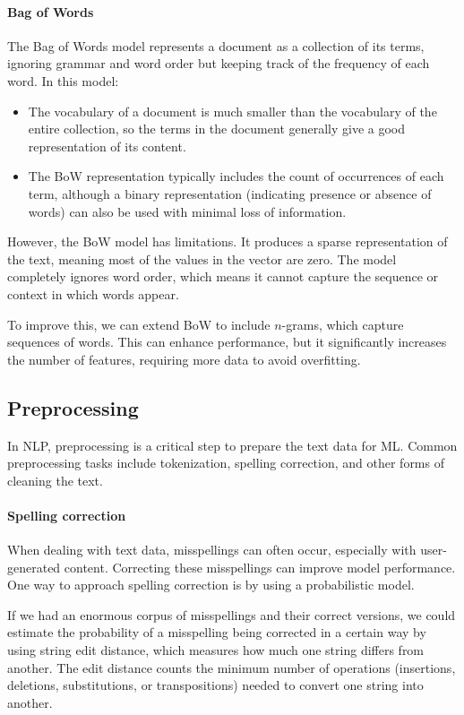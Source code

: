 \paragraph*{Bag of Words}
The Bag of Words model represents a document as a collection of its terms, ignoring grammar and word order but keeping track of the frequency of each word. 
In this model:
\begin{itemize}
    \item The vocabulary of a document is much smaller than the vocabulary of the entire collection, so the terms in the document generally give a good representation of its content.
    \item The BoW representation typically includes the count of occurrences of each term, although a binary representation (indicating presence or absence of words) can also be used with minimal loss of information.
\end{itemize}
\noindent However, the BoW model has limitations. 
It produces a sparse representation of the text, meaning most of the values in the vector are zero.
The model completely ignores word order, which means it cannot capture the sequence or context in which words appear.

To improve this, we can extend BoW to include $n$-grams, which capture sequences of words. 
This can enhance performance, but it significantly increases the number of features, requiring more data to avoid overfitting.

\subsection{Preprocessing}
In NLP, preprocessing is a critical step to prepare the text data for ML. 
Common preprocessing tasks include tokenization, spelling correction, and other forms of cleaning the text.

\paragraph*{Spelling correction}
When dealing with text data, misspellings can often occur, especially with user-generated content. 
Correcting these misspellings can improve model performance. One way to approach spelling correction is by using a probabilistic model.

If we had an enormous corpus of misspellings and their correct versions, we could estimate the probability of a misspelling being corrected in a certain way by using string edit distance, which measures how much one string differs from another.
The edit distance counts the minimum number of operations (insertions, deletions, substitutions, or transpositions) needed to convert one string into another.

